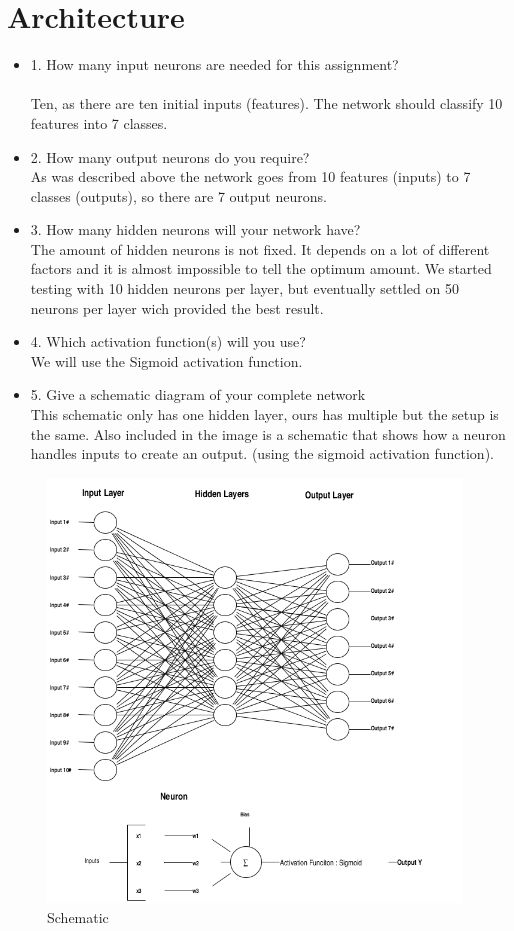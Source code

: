 
\section{Architecture} 
\label {chapter:architecture}
\begin{itemize}
\item 1. How many input neurons are needed for this assignment?\\\\
Ten, as there are ten initial inputs (features). The network should classify 10 features into 7 classes.
\item 2. How many output neurons do you require?\\
As was described above the network goes from 10 features (inputs) to 7 classes (outputs), so there are 7 output neurons.
\item 3. How many hidden neurons will your network have?\\
The amount of hidden neurons is not fixed. It depends on a lot of different factors and it is almost impossible to tell the optimum amount. We started testing with 10 hidden neurons per layer, but eventually settled on 50 neurons per layer wich provided the best result.
\item 4. Which activation function(s) will you use?\\
We will use the Sigmoid activation function.
\item 5. Give a schematic diagram of your complete network\\
This schematic only has one hidden layer, ours has multiple but the setup is the same. Also included in the image is a schematic that shows how a neuron handles inputs to create an output.
(using the sigmoid activation function).
\end{itemize}

\begin{figure}[!h]
\begin{center}
\includegraphics[width=11cm]{images/schemeit-project.png}
\caption{Schematic }
\label{schematic}
\end{center}
\end{figure}
\FloatBarrier


